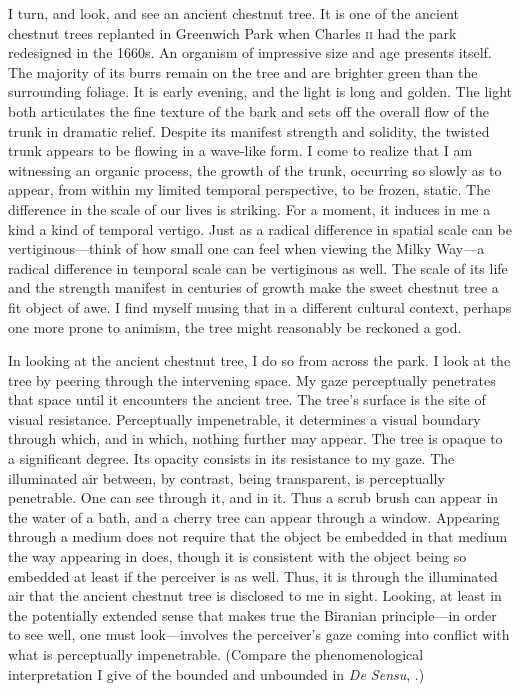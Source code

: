 I turn, and look, and see an ancient chestnut tree. It is one of the ancient chestnut trees replanted in Greenwich Park when Charles \textsc{ii} had the park redesigned in the 1660s. An organism of impressive size and age presents itself. The majority of its burrs remain on the tree and are brighter green than the surrounding foliage. It is early evening, and the light is long and golden. The light both articulates the fine texture of the bark and sets off the overall flow of the trunk in dramatic relief. Despite its manifest strength and solidity, the twisted trunk appears to be flowing in a wave-like form. I come to realize that I am witnessing an organic process, the growth of the trunk, occurring so slowly as to appear, from within my limited temporal perspective, to be frozen, static. The difference in the scale of our lives is striking. For a moment, it induces in me a kind a kind of temporal vertigo.  Just as a radical difference in spatial scale can be vertiginous---think of how small one can feel when viewing the Milky Way---a radical difference in temporal scale can be vertiginous as well. The scale of its life and the strength manifest in centuries of growth make the sweet chestnut tree a fit object of awe. I find myself musing that in a different cultural context, perhaps one more prone to animism, the tree might reasonably be reckoned a god. 

In looking at the ancient chestnut tree, I do so from across the park. I look at the tree by peering through the intervening space. My gaze perceptually penetrates that space until it encounters the ancient tree. The tree's surface is the site of visual resistance. Perceptually impenetrable, it determines a visual boundary through which, and in which, nothing further may appear. The tree is opaque to a significant degree. Its opacity consists in its resistance to my gaze. The illuminated air between, by contrast, being transparent, is perceptually penetrable. One can see through it, and in it. Thus a scrub brush can appear in the water of a bath, and a cherry tree can appear through a window. Appearing through a medium does not require that the object be embedded in that medium the way appearing in does, though it is consistent with the object being so embedded at least if the perceiver is as well. Thus, it is through the illuminated air that the ancient chestnut tree is disclosed to me in sight. Looking, at least in the potentially extended sense that makes true the Biranian principle---in order to see well, one must look---involves the perceiver's gaze coming into conflict with what is perceptually impenetrable. (Compare the phenomenological interpretation I give of the bounded and unbounded in \emph{De Sensu}, \citealt[chapter 3.3]{Kalderon:2015fr}.)

